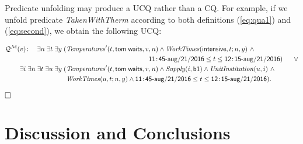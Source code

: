 \documentclass[format=acmsmall, review=false, screen=true]{acmart}
\newcommand{\ignore}[1]{}
\newcommand{\cq}{CQ}
\newcommand{\boxtheorem}{\ensuremath{\hfill \Box}}
\newcommand{\mc}[1]{\mathcal{ #1}}
\newcommand{\nit}[1]{{\it #1}}
\newcommand{\CQQA}{{\sf QualityQA}}
\newcommand{\vectt}[1]{\bar{#1}}
\newcommand{\red}[1]{{#1}}
\begin{document}
\begin{example}
\red{Predicate unfolding may produce a UCQ rather than a \cq. For example, if we unfold predicate {\it TakenWithTherm} according to both definitions (\ref{eq:qua1}) and (\ref{eq:second}), we obtain the following UCQ:}

\red{\vspace{-4mm}
{\small \begin{align*}
\mc{Q}^{\mc{M}}(v)\!:\ \ \ \exists n\;\exists t\;\exists y\;(&\nit{Temperatures}'(t,{\sf tom\;waits},v,n)  \wedge  \nit{WorkTimes}({\sf intensive},t;n,y) \ \wedge \\
&~~~~~~~~~~~~~~~~~~~~~~~~~~~~~~~~~~~~~{\sf 11\!:\!45\mbox{-}aug\mbox{/}21\mbox{/}2016} \le t \le {\sf 12\!:\!15\mbox{-}aug\mbox{/}21\mbox{/}2016}) \ \ \ \ \ \vee \\
\hspace*{5mm}\exists i\;\exists n\;\exists t\;\exists u\;\exists y\;(&\nit{Temperatures}'(t,{\sf tom\;waits},v,n)  \wedge  \nit{Supply}(i,{\sf b1}) \wedge \nit{UnitInstitution}(u,i) \ \wedge\\
& \nit{WorkTimes}(u,t;n,y) \wedge {\sf 11\!:\!45\mbox{-}aug\mbox{/}21\mbox{/}2016} \le t \le {\sf 12\!:\!15\mbox{-}aug\mbox{/}21\mbox{/}2016}). %
\end{align*}}}


\vspace*{-1cm}\boxtheorem\end{example}

\ignore{
\red{Under} our approach, data cleaning \red{(or extraction of quality data from an initial table)} amounts to obtaining a clean instance $D^q$ from the dirty target instance $D$, and it is done by collecting clean extensions $R_1^q,...,R_n^q$ \red{of $R_1,...,R_n \in \mc{R}$}. The clean extension $R^q$ of possibly dirty relation $R$ in $D$ is obtained by answering the atomic query $\mc{Q}(\vectt{x})\!:R(\vectt{x})$ using \CQQA. In particular, the algorithm uses a rule of the general form~(\ref{frm:qvd}) to collect the clean data of $R^q$ by applying conditions in $\psi^\mc{P}_{R'}$ on $R'$.
}




\section{Discussion and Conclusions} \label{sec:cfw}
\end{document}
